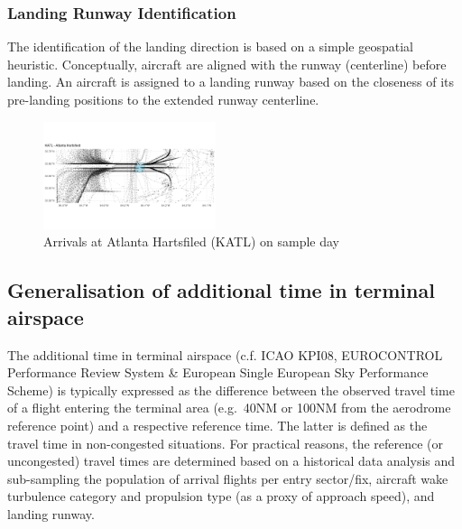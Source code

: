 \documentclass[letterpaper, 10 pt, journal, twoside]{IEEEtran}
\begin{document}
\hypertarget{landing-runway-identification}{%
\subsubsection{Landing Runway
Identification}\label{landing-runway-identification}}

The identification of the landing direction is based on a simple
geospatial heuristic. Conceptually, aircraft are aligned with the runway
(centerline) before landing. An aircraft is assigned to a landing runway
based on the closeness of its pre-landing positions to the extended
runway centerline.

\begin{figure}

{\centering \includegraphics[width=0.45\textwidth,height=\textheight]{./figures/KATL-traffic-single-day.png}

}

\caption{\label{fig-KATL-arrivals}Arrivals at Atlanta Hartsfiled (KATL)
on sample day}

\end{figure}

\hypertarget{generalisation-of-additional-time-in-terminal-airspace}{%
\subsection{Generalisation of additional time in terminal
airspace}\label{generalisation-of-additional-time-in-terminal-airspace}}

The additional time in terminal airspace (c.f. ICAO KPI08, EUROCONTROL
Performance Review System \& European Single European Sky Performance
Scheme) is typically expressed as the difference between the observed
travel time of a flight entering the terminal area (e.g.~40NM or 100NM
from the aerodrome reference point) and a respective reference time. The
latter is defined as the travel time in non-congested situations. For
practical reasons, the reference (or uncongested) travel times are
determined based on a historical data analysis and sub-sampling the
population of arrival flights per entry sector/fix, aircraft wake
turbulence category and propulsion type (as a proxy of approach speed),
and landing runway.
\end{document}
